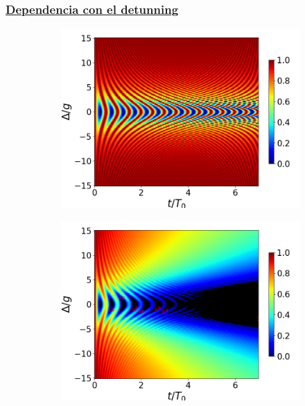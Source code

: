\subsubsection{\underline{Dependencia con el detunning}}
\begin{figure}[h!]
    \centering
    \begin{subfigure}{0.49\textwidth}
        \includegraphics[width=\textwidth]{figuras/ch4/concu/delta/eg0+ge0 k=0.0g x=0.0g J=0.0g gamma=0.25g concu delta uni.png}
        \caption{}
        \label{fig4:concu detunning 0 uni}
    \end{subfigure}
    \hfill
    \begin{subfigure}{0.49\textwidth}
        \includegraphics[width=\textwidth]{figuras/ch4/concu/delta/eg0+ge0 k=0.0g x=0.0g J=0.0g gamma=0.25g concu delta dis.png}

\end{subfigure}
\end{figure}
